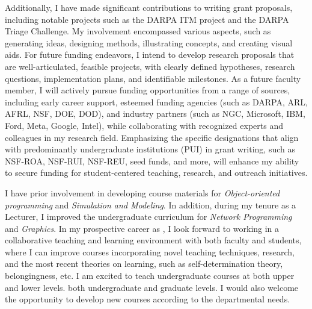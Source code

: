 \documentclass[10pt]{article}
\renewcommand*\paragraph[1]{}
\begin{document}
Additionally, I have made significant contributions to writing grant proposals, including notable projects such as the DARPA ITM project and the DARPA Triage Challenge. My involvement encompassed various aspects, such as generating ideas, designing methods, illustrating concepts, and creating visual aids. For future funding endeavors, I intend to develop research proposals that are well-articulated, feasible projects, with clearly defined hypotheses, research questions, implementation plans, and identifiable milestones. As a future faculty member, I will actively pursue funding opportunities from a range of sources, including early career support, esteemed funding agencies (such as DARPA, ARL, AFRL, NSF, DOE, DOD), and industry partners (such as NGC, Microsoft, IBM, Ford, Meta, Google, Intel), while collaborating with recognized experts and colleagues in my research field. Emphasizing the specific designations that align with predominantly undergraduate institutions (PUI) in grant writing, such as NSF-ROA, NSF-RUI, NSF-REU, seed funds, and more, will enhance my ability to secure funding for student-centered teaching, research, and outreach initiatives.


\paragraph{curriculum development for lecture and lab courses in Computer Science/Data Science}
I have prior involvement in developing course materials for \textit{Object-oriented programming} and \textit{Simulation and Modeling}. In addition, during my tenure as a Lecturer, I improved the undergraduate curriculum for \textit{Network Programming} and \textit{Graphics}.
In my prospective career as \PositionName{}, I look forward to working in a collaborative teaching and learning environment with both faculty and students, where I can improve courses incorporating novel teaching  techniques, research, and the most recent theories on learning, such as self-determination theory, belongingness, etc. 
I am excited to teach 
\ifx\degreeLevel\undefined 
undergraduate
\fi
courses at 
\ifx\degreeLevel\undefined 
both upper and lower levels.
\else
both undergraduate and graduate levels.
\fi
I would also welcome the opportunity to develop new courses according to the departmental needs.
\end{document}

